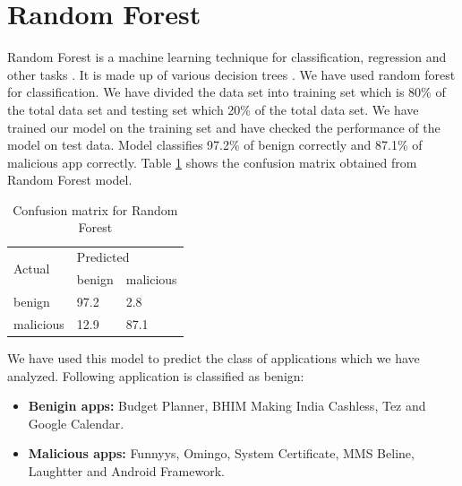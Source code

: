 \section{Random Forest}
Random Forest is a machine learning technique for classification, regression and other tasks \cite{wiki:xxx5}. It is made up of various decision trees \cite{wiki:xxx6}. We have used random forest for classification. We have divided the data set into training set which is 80\% of the total data set and testing set which 20\% of the total data set. We have trained our model on the training set and have checked the performance of the model on test data. Model classifies 97.2\% of benign correctly and 87.1\% of malicious app correctly. Table \ref{table:tab5} shows the confusion matrix obtained from Random Forest model. 
\begin{table}[!h]
\centering

\begin{tabular}{|l||l|l|}
\hline
\multirow{2}{4em}{Actual} & \multicolumn{2}{l|}{Predicted} \\ \cline{2-3} 
                  &    benign      &    malicious       \\ \hline
         benign         &      97.2     &    2.8     \\ \hline
        malicious          &     12.9      &      87.1     \\ \hline
\end{tabular}%
\caption{Confusion matrix for Random Forest}
\label{table:tab5}
\end{table}
We have used this model to predict the class of applications which we have analyzed. Following application is classified as benign:
\begin{itemize}
    \item \textbf{Benigin apps: }Budget Planner, BHIM Making India Cashless, Tez and Google Calendar.
    \item \textbf{Malicious apps: }Funnyys, Omingo, System Certificate, MMS Beline, Laughtter and Android Framework.
\end{itemize}

